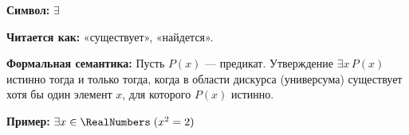 
\hypertarget{axiom-exists}{}
\begin{object} %

\textbf{Символ:} $\exists$

\textbf{Читается как:} «существует», «найдется».

\textbf{Формальная семантика:}
Пусть $P(x)$ — предикат. Утверждение $\exists x\, P(x)$ истинно тогда и только тогда,
когда в области дискурса (универсума) существует хотя бы один элемент $x$, для которого $P(x)$ истинно.

\textbf{Пример:} $\exists x \in \RealNumbers\; (x^2 = 2)$
\end{object}